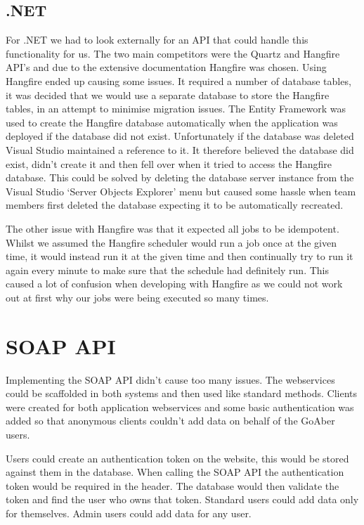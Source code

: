 \subsection{.NET}
For .NET we had to look externally for an API that could handle this functionality for us. The two main competitors were the Quartz\cite{quartz} and Hangfire\cite{hangfire} API’s and due to the extensive documentation Hangfire was chosen.
Using Hangfire ended up causing some issues. It required a number of database tables, it was decided that we would use a separate database to store the Hangfire tables, in an attempt to minimise migration issues. The Entity Framework was used to create the Hangfire database automatically when the application was deployed if the database did not exist. Unfortunately if the database was deleted Visual Studio maintained a reference to it. It therefore believed the database did exist, didn’t create it and then fell over when it tried to access the Hangfire database. This could be solved by deleting the database server instance from the Visual Studio ‘Server Objects Explorer’ menu but caused some hassle when team members first deleted the database expecting it to be automatically recreated. \par
The other issue with Hangfire was that it expected all jobs to be idempotent. Whilst we assumed the Hangfire scheduler would run a job once at the given time, it would instead run it at the given time and then continually try to run it again every minute to make sure that the schedule had definitely run. This caused a lot of confusion when developing with Hangfire as we could not work out at first why our jobs were being executed so many times. 
\section{SOAP API}
Implementing the SOAP API didn’t cause too many issues. The webservices could be scaffolded in both systems and then used like standard methods. Clients were created for both application webservices and some basic authentication was added so that anonymous clients couldn’t add data on behalf of the GoAber users. \par 
Users could create an authentication token on the website, this would be stored against them in the database. When calling the SOAP API the authentication token would be required in the header. The database would then validate the token and find the user who owns that token. Standard users could add data only for themselves. Admin users could add data for any user.
